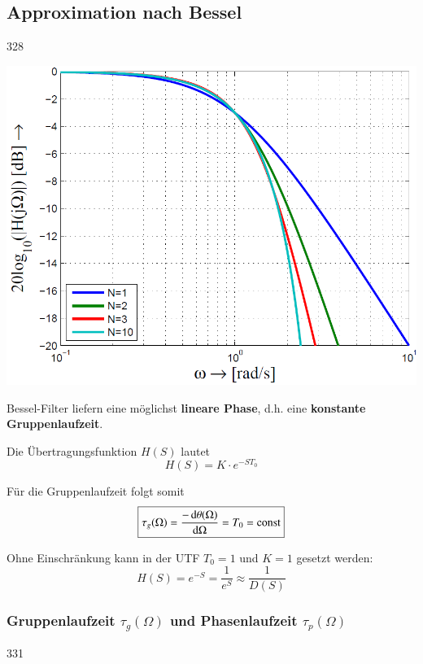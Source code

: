 \subsection{Approximation nach Bessel}{328}

\begin{minipage}[c]{0.45\columnwidth}
    \includegraphics[width=\columnwidth]{images/filter_bessel_amplitudengang.png}
\end{minipage}
\hfill
\begin{minipage}[c]{0.48\columnwidth}
    Bessel-Filter liefern eine möglichst \textbf{lineare Phase}, d.h. eine \textbf{konstante Gruppenlaufzeit}.

    Die Übertragungsfunktion $H(S)$ lautet
    $$ \boxed{ H(S) = K \cdot e^{-S T_0} } $$

    Für die Gruppenlaufzeit folgt somit
    $$ \boxed{ \tau_g(\Omega) = \frac{- \mathop{} \! \mathrm{d} \theta(\Omega)}{\mathop{} \! \mathrm{d} \Omega} = T_0 = \mathrm{const} } $$
\end{minipage}

\vspace{0.2cm}
Ohne Einschränkung kann in der UTF $T_0 = 1$ und $K = 1$ gesetzt werden:
$$ H(S) = e^{-S} = \frac{1}{e^S} \approx \frac{1}{D(S)} $$


\subsubsection{Gruppenlaufzeit $\tau_g(\Omega)$ und Phasenlaufzeit $\tau_p(\Omega)$}{331}

